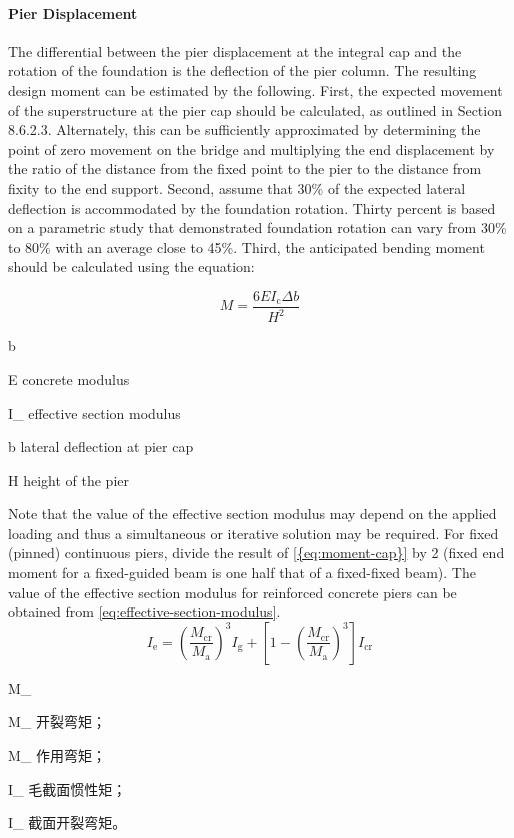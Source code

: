\paragraph{Pier Displacement}
The differential between the pier displacement at the integral cap and the rotation of the foundation is the deflection of the pier column. The resulting design moment can be estimated by the following. First, the expected movement of the superstructure at the pier cap should be calculated, as outlined in Section 8.6.2.3. Alternately, this can be sufficiently approximated by determining the point of zero movement on the bridge and multiplying the end displacement by the ratio of the distance from the fixed point to the pier to the distance from fixity to the end support. Second, assume that 30\% of the expected lateral deflection is accommodated by the foundation rotation. Thirty percent is based on a parametric study that demonstrated foundation rotation can vary from 30\% to 80\% with an average close to 45\%. Third, the anticipated bending moment should be calculated using the equation:

\begin{equation}
  \label{eq:moment-cap}
  M = \frac{6EI_\text{c}\Delta b}{H^2}
\end{equation}
\begin{EqDesc}{\Delta b}
  \item[E] concrete modulus
  \item[I_\text{c}] effective section modulus
  \item[\Delta b] lateral deflection at pier cap
  \item[H] height of the pier
\end{EqDesc}

Note that the value of the effective section modulus may depend on the applied loading and thus a simultaneous or iterative solution may be required. For fixed (pinned) continuous piers, divide the result of \cref{{eq:moment-cap}} by 2 (fixed end moment for a fixed-guided beam is one half that of a fixed-fixed beam). The value of the effective section modulus for reinforced concrete piers can be obtained from \cref{eq:effective-section-modulus}.
\begin{equation}
  \label{eq:effective-section-modulus}
  I_\text{e} = \left(\frac{M_\text{cr}}{M_\text{a}}\right)^3 I_\text{g} + \left[ 1-\left(\frac{M_\text{cr}}{M_\text{a}}\right)^3\right] I_\text{cr}
\end{equation}
\begin{EqDesc}{M_}
  \item[M_\text{cr}] 开裂弯矩；
  \item[M_\text{a}] 作用弯矩；
  \item[I_\text{g}] 毛截面惯性矩；
  \item[I_\text{cr}] 截面开裂弯矩。
\end{EqDesc}

